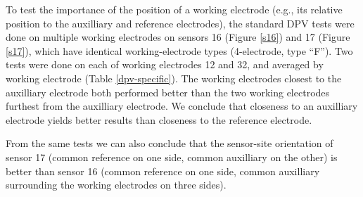 To test the importance of the position of a working electrode (e.g., its relative position to the auxilliary and reference electrodes), the standard DPV tests were done on multiple working electrodes on sensors 16 (Figure \ref{s16}) and 17 (Figure \ref{s17}), which have identical working-electrode types (4-electrode, type ``F''). Two tests were done on each of working electrodes 12 and 32, and averaged by working electrode (Table \ref{dpv-specific}). The working electrodes closest to the auxilliary electrode both performed better than the two working electrodes furthest from the auxilliary electrode. We conclude that closeness to an auxilliary electrode yields better results than closeness to the reference electrode.

From the same tests we can also conclude that the sensor-site orientation of sensor 17 (common reference on one side, common auxilliary on the other) is better than sensor 16 (common reference on one side, common auxilliary surrounding the working electrodes on three sides).


